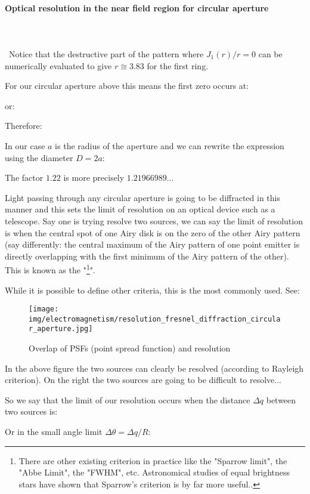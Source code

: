	\paragraph{Optical resolution in the near field region for circular aperture}\mbox{}\\\\\
	Notice that the destructive part of the pattern where $J_1(r)/r=0$ can be numerically evaluated to give $r\cong 3.83$ for the first ring.
	
	For our circular aperture above this means the first zero occurs at:
	
	or:
	
	Therefore:
	
	In our case $a$ is the radius of the aperture and we can rewrite the expression using the diameter $D=2a$:
	
	The factor $1.22$ is more precisely $1.21966989\ldots$
	
	Light passing through any circular aperture is going to be diffracted in this manner and this sets the limit of resolution on an optical device such as a telescope. Say one is trying resolve two sources, we can say the limit of resolution is when the central spot of one Airy disk is on the zero of the other Airy pattern (say differently: the central maximum of the Airy pattern of one point emitter is directly overlapping with the first minimum of the Airy pattern of the other). This is known as the "\footnote{There are other existing criterion in practice like the "Sparrow limit", the "Abbe Limit", the "FWHM", etc. Astronomical studies of equal brightness stars have shown that Sparrow’s criterion is by far more useful..}\label{Rayleigh criterion}".
	
	While it is possible to define other criteria, this is the most commonly used. See:
	\begin{figure}[H]
		\centering
		\texttt{[image: img/electromagnetism/resolution\_fresnel\_diffraction\_circular\_aperture.jpg]}
		\caption{Overlap of PSFs (point spread function) and resolution}
	\end{figure}
	In the above figure the two sources can clearly be resolved (according to Rayleigh criterion). On the right the two sources are going to be difficult to resolve...
	
	So we say that the limit of our resolution occurs when the distance $\Delta q$ between two sources is:
	
	Or in the small angle limit $\Delta \theta=\Delta q/R$:
	
